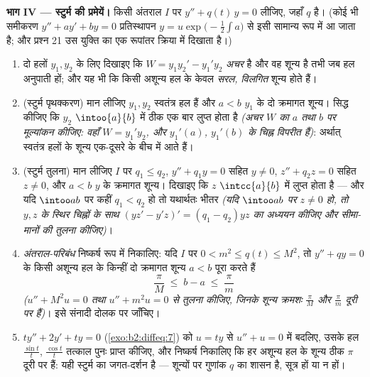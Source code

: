 \begin{problem}
\medskip
\noindent\textbf{भाग IV --- स्टुर्म की प्रमेयें।} किसी अंतराल $I$ पर $y''
+ q(t)\,y = 0$
लीजिए, जहाँ $q$  है। (कोई भी समीकरण $y'' + ay' + by = 0$ प्रतिस्थापन $y = u\exp\bigl(-\frac12\int a\bigr)$ से इसी
सामान्य रूप में आ जाता है; और प्रश्न 21 उस युक्ति का एक रूपांतर क्रिया में
दिखाता है।)
\begin{enumerate}[resume]
  \item दो हलों $y_1, y_2$ के लिए दिखाइए कि  $W = y_1y_2' - y_1'y_2$ \emph{अचर} है और वह
        शून्य है तभी जब हल अनुपाती हों; और यह भी कि किसी अशून्य हल के
        केवल \emph{सरल, विलगित} शून्य होते हैं।
  \item (स्टुर्म पृथक्करण) मान लीजिए $y_1, y_2$ स्वतंत्र हल हैं और $a < b$ $y_1$ के दो
        क्रमागत शून्य। सिद्ध कीजिए कि $y_2$ $\intoo{a}{b}$ में ठीक एक बार लुप्त होता
        है \emph{(अचर $W$ का $a$ तथा $b$ पर मूल्यांकन कीजिए: वहाँ $W = y_1'y_2$,
        और $y_1'(a)$, $y_1'(b)$ के चिह्न विपरीत हैं)}: अर्थात् स्वतंत्र हलों के
        शून्य एक-दूसरे के बीच में आते हैं।
  \item (स्टुर्म तुलना) मान लीजिए $I$ पर $q_1 \leq q_2$, $y'' + q_1y = 0$ सहित $y \neq
        0$, $z'' + q_2z
        = 0$ सहित
        $z \neq 0$, और $a < b$ $y$ के क्रमागत शून्य। दिखाइए कि $z$ $\intcc{a}{b}$ में लुप्त
        होता है --- और यदि $\intoo ab$ पर कहीं $q_1 < q_2$ हो तो यथार्थतः भीतर \emph{(यदि
        $\intoo ab$ पर $z \neq
        0$ हो, तो $y, z$ के स्थिर चिह्नों के साथ $(yz' - y'z)' = (q_1 -
        q_2)yz$ का अध्ययन
        कीजिए और सीमा-मानों की तुलना कीजिए)}।
  \item \emph{अंतराल-परिबंध} निष्कर्ष रूप में निकालिए: यदि $I$ पर $0 < m^2 \leq
        q(t) \leq M^2$,
        तो $y'' + qy = 0$ के किसी अशून्य हल के किन्हीं दो क्रमागत शून्य $a < b$ पूरा
        करते हैं
        \[
        \frac{\pi}{M} \;\leq\; b - a \;\leq\; \frac{\pi}{m}
        \]
        \emph{($u'' + M^2u = 0$ तथा $u'' + m^2u
        = 0$ से तुलना कीजिए, जिनके शून्य क्रमशः $\frac\pi M$ और
        $\frac\pi m$ दूरी पर हैं)}। इसे संनादी दोलक पर जाँचिए।
  \item $ty'' + 2y' + ty = 0$ (\cref{exo:b2:diffeq:7}) को $u = ty$ से $u'' + u =
        0$ में बदलिए, उसके हल $\frac{\sin t}t$, $\frac{\cos t}{t}$ तत्काल
        पुनः प्राप्त कीजिए, और निष्कर्ष निकालिए कि हर अशून्य हल के शून्य
        ठीक $\pi$ दूरी पर हैं: यही स्टुर्म का जगत-दर्शन है --- शून्यों पर
        गुणांक $q$ का शासन है, सूत्र हों या न हों।
\end{enumerate}


\end{problem}
